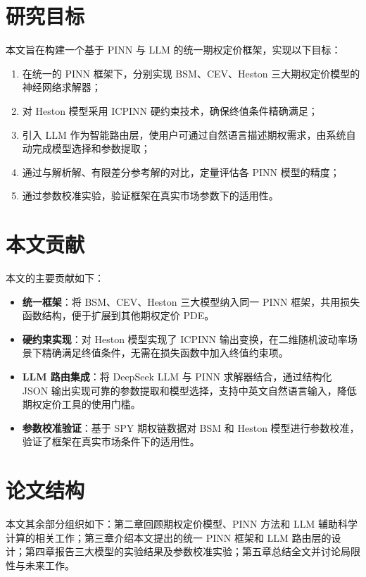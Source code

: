 \section{研究目标}\label{sec:objectives}

本文旨在构建一个基于 PINN 与 LLM 的统一期权定价框架，实现以下目标：

\begin{enumerate}
  \item 在统一的 PINN 框架下，分别实现 BSM、CEV、Heston 三大期权定价模型的神经网络求解器；
  \item 对 Heston 模型采用 ICPINN 硬约束技术\citep{guo2024icpinn}，确保终值条件精确满足；
  \item 引入 LLM 作为智能路由层，使用户可通过自然语言描述期权需求，由系统自动完成模型选择和参数提取；
  \item 通过与解析解、有限差分参考解的对比，定量评估各 PINN 模型的精度；
  \item 通过参数校准实验，验证框架在真实市场参数下的适用性。
\end{enumerate}

\section{本文贡献}\label{sec:contributions}

本文的主要贡献如下：

\begin{itemize}
  \item \textbf{统一框架}：将 BSM、CEV、Heston 三大模型纳入同一 PINN 框架，共用损失函数结构，便于扩展到其他期权定价 PDE。
  \item \textbf{硬约束实现}：对 Heston 模型实现了 ICPINN 输出变换，在二维随机波动率场景下精确满足终值条件，无需在损失函数中加入终值约束项。
  \item \textbf{LLM 路由集成}：将 DeepSeek LLM 与 PINN 求解器结合，通过结构化 JSON 输出实现可靠的参数提取和模型选择，支持中英文自然语言输入，降低期权定价工具的使用门槛。
  \item \textbf{参数校准验证}：基于 SPY 期权链数据对 BSM 和 Heston 模型进行参数校准，验证了框架在真实市场条件下的适用性。
\end{itemize}

\section{论文结构}\label{sec:structure}

本文其余部分组织如下：第二章回顾期权定价模型、PINN 方法和 LLM 辅助科学计算的相关工作；第三章介绍本文提出的统一 PINN 框架和 LLM 路由层的设计；第四章报告三大模型的实验结果及参数校准实验；第五章总结全文并讨论局限性与未来工作。

